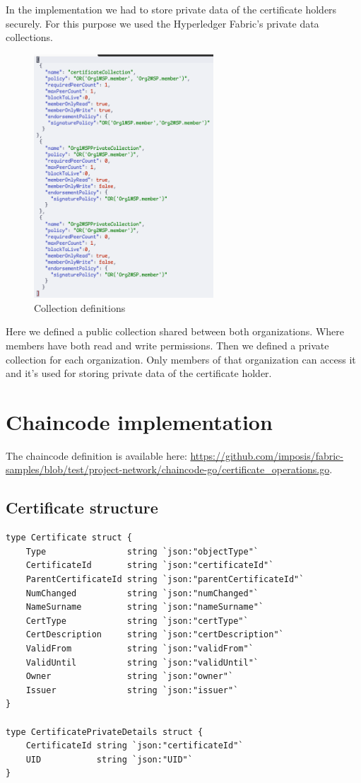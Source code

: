 \documentclass[12pt]{article}
\begin{document}
In the implementation we had to store private data of the certificate holders securely. For this purpose we used the Hyperledger Fabric's private data collections.
\begin{figure}[H]
    \centering
    \includegraphics[width=0.6\textwidth]{imgs/collection_json.PNG}
    \caption{Collection definitions}
    \label{fig:collection}
\end{figure}

Here we defined a public collection shared between both organizations. Where members have both read and write permissions.
Then we defined a private collection for each organization. Only members of that organization can access it and it's used for storing private data of the certificate holder.

\newpage

\section{Chaincode implementation}
The chaincode definition is available here: \url{https://github.com/imposis/fabric-samples/blob/test/project-network/chaincode-go/certificate_operations.go}.

\subsection{Certificate structure}

\begin{lstlisting}[language=Golang]
type Certificate struct {
	Type                string `json:"objectType"`
	CertificateId       string `json:"certificateId"`
	ParentCertificateId string `json:"parentCertificateId"`
	NumChanged          string `json:"numChanged"`
	NameSurname         string `json:"nameSurname"`
	CertType            string `json:"certType"`
	CertDescription     string `json:"certDescription"`
	ValidFrom           string `json:"validFrom"`
	ValidUntil          string `json:"validUntil"`
	Owner               string `json:"owner"`
	Issuer              string `json:"issuer"`
}

type CertificatePrivateDetails struct {
	CertificateId string `json:"certificateId"`
	UID           string `json:"UID"`
}
\end{lstlisting}
\end{document}
